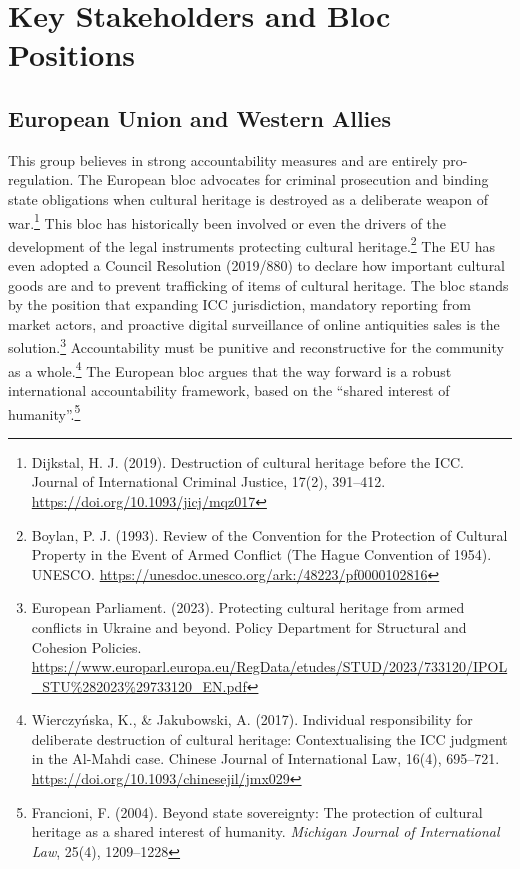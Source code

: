 \section{Key Stakeholders and Bloc Positions}

\subsection{European Union and Western Allies}

This group believes in strong accountability measures and are entirely pro-regulation. The European bloc advocates for criminal prosecution and binding state obligations when cultural heritage is destroyed as a deliberate weapon of war.\footnote{Dijkstal, H. J. (2019). Destruction of cultural heritage before the ICC. Journal of International Criminal Justice, 17(2), 391–412. \url{https://doi.org/10.1093/jicj/mqz017}} This bloc has historically been involved or even the drivers of the development of the legal instruments protecting cultural heritage.\footnote{Boylan, P. J. (1993). Review of the Convention for the Protection of Cultural Property in the Event of Armed Conflict (The Hague Convention of 1954). UNESCO. \url{https://unesdoc.unesco.org/ark:/48223/pf0000102816}} The EU has even adopted a Council Resolution (2019/880) to declare how important cultural goods are and to prevent trafficking of items of cultural heritage. The bloc stands by the position that expanding ICC jurisdiction, mandatory reporting from market actors, and proactive digital surveillance of online antiquities sales is the solution.\footnote{European Parliament. (2023). Protecting cultural heritage from armed conflicts in Ukraine and beyond. Policy Department for Structural and Cohesion Policies. \url{https://www.europarl.europa.eu/RegData/etudes/STUD/2023/733120/IPOL_STU\%282023\%29733120_EN.pdf}} Accountability must be punitive and reconstructive for the community as a whole.\footnote{Wierczyńska, K., \& Jakubowski, A. (2017). Individual responsibility for deliberate destruction of cultural heritage: Contextualising the ICC judgment in the Al-Mahdi case. Chinese Journal of International Law, 16(4), 695–721. \url{https://doi.org/10.1093/chinesejil/jmx029}} The European bloc argues that the way forward is a robust international accountability framework, based on the “shared interest of humanity”.\footnote{Francioni, F. (2004). Beyond state sovereignty: The protection of cultural heritage as a shared interest of humanity. \emph{Michigan Journal of International Law}, 25(4), 1209–1228}

